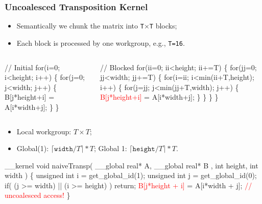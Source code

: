 \documentclass{beamer}
\newcommand{\red}[1]{\textcolor{Red}{{#1}}}
\newcommand{\emp}[1]{\textcolor{DikuRed}{ #1}}
\newcommand{\emphh}[1]{\textcolor{CosGreen}{ #1}}
\begin{document}
\begin{frame}[fragile,t]
  \frametitle{Uncoalesced Transposition Kernel} 

\begin{itemize}
    \item Semantically we chunk the matrix into {\tt T$\times$T} blocks;
    \item Each block is processed by one workgroup, e.g., {\tt T=16}.
\end{itemize}

\begin{columns}
\begin{colorcode}[fontsize=\scriptsize]
// Initial
for(i=0; i<height; i++) \{    
  for(j=0; j<width; j++) \{ 
    B[j*height+i] =
           A[i*width+j];
  \}
\}
\end{colorcode}
\begin{colorcode}[fontsize=\scriptsize]
// Blocked
\emp{for(ii=0; ii<height; ii+=T) \{}
  \emp{for(jj=0; jj<width; jj+=T) \{}
    \emphh{for(i=ii; i<min(ii+T,height); i++) \{}
      \emphh{for(j=jj; j<min(jj+T,width); j++) \{}
        \red{B[j*height+i]} = A[i*width+j];
\} \} \} \}
\end{colorcode}
\end{columns}

\begin{itemize}
\item Local workgroup: $T\times T$; 
\item Global(1): $\lceil \texttt{width}/T \rceil * T$; Global 1: $\lceil \texttt{height}/T \rceil * T$.
\end{itemize}
\pause

\begin{colorcode}[fontsize=\scriptsize]
__kernel void naiveTransp( __global real* A, __global real* B
                         , int height, int width ) \{
    unsigned int i = get_global_id(1);
    unsigned int j = get_global_id(0); 
    if( (j >= width) || (i >= height) ) return;
    \red{B[j*height + i]} = A[i*width + j];  \red{// uncoalesced access!}
\}

\end{colorcode}

\end{frame}
\end{document}
